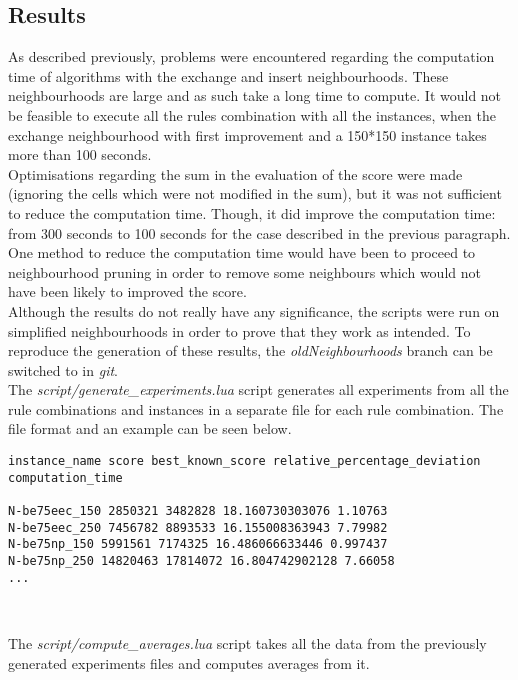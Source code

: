 \newpage

\subsection{Results}

As described previously, problems were encountered regarding the computation time
of algorithms with the exchange and insert neighbourhoods. These neighbourhoods
are large and as such take a long time to compute. It would not be feasible to
execute all the rules combination with all the instances, when the exchange
neighbourhood with first improvement and a 150*150 instance takes more than
100 seconds.\\

Optimisations regarding the sum in the evaluation of the score were made
(ignoring the cells which were not modified in the sum), but it was not
sufficient to reduce the computation time. Though, it did improve the
computation time: from 300 seconds to 100 seconds for the case described in the
previous paragraph.\\

One method to reduce the computation time would have been to proceed to
neighbourhood pruning in order to remove some neighbours which would not have
been likely to improved the score.\\

Although the results do not really have any significance, the scripts were run
on simplified neighbourhoods in order to prove that they work as intended. To
reproduce the generation of these results, the \emph{oldNeighbourhoods} branch
can be switched to in \emph{git}.\\

The \emph{script/generate\_experiments.lua} script generates all experiments from
all the rule combinations and instances in a separate file for each rule
combination. The file format and an example can be seen below.\\

\begin{lstlisting}
instance_name score best_known_score relative_percentage_deviation computation_time

N-be75eec_150 2850321 3482828 18.160730303076 1.10763
N-be75eec_250 7456782 8893533 16.155008363943 7.79982
N-be75np_150 5991561 7174325 16.486066633446 0.997437
N-be75np_250 14820463 17814072 16.804742902128 7.66058
...
\end{lstlisting}
\

The \emph{script/compute\_averages.lua} script takes all the data from the
previously generated experiments files and computes averages from it.\\


